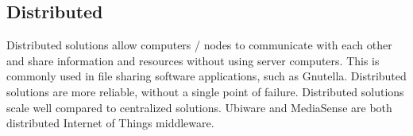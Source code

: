 \subsection{Distributed}
Distributed solutions allow computers / nodes to communicate with each other and share information and resources without using server computers. This is commonly used in file sharing software applications, such as Gnutella. Distributed solutions are more reliable, without a single point of failure. Distributed solutions scale well compared to centralized solutions. Ubiware \cite{osterle2010memorandum} and MediaSense \cite{TheMediaSenseFramework} are both distributed Internet of Things middleware. 


